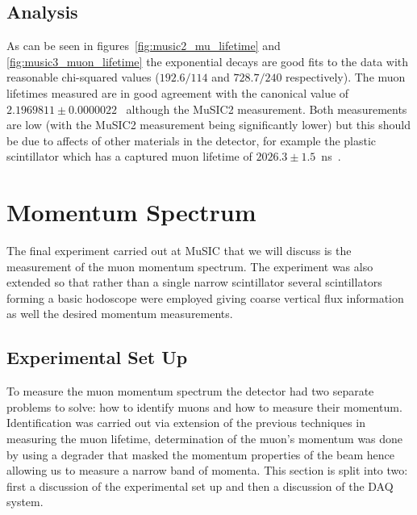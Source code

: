 \section{Analysis} %
\label{sec:analysis}
As can be seen in figures~\ref{fig:music2_mu_lifetime} and \ref{fig:music3_muon_lifetime} the exponential decays are good fits to the data with reasonable chi-squared values (\(192.6/114\) and \( 728.7/240 \) respectively). The muon lifetimes measured are in good agreement with the canonical value of \(2.1969811\pm0.0000022\)~\cite{PDG} although the MuSIC2 measurement. Both measurements are low (with the MuSIC2 measurement being significantly lower) but this should be due to affects of other materials in the detector, for example the plastic scintillator which has a captured muon lifetime of \(2026.3\pm1.5\)~ns~\cite{SUZUKI}. 

\chapter{Momentum Spectrum} %
\label{cha:momentum_spectrum}
The final experiment carried out at MuSIC that we will discuss is the measurement of the muon momentum spectrum. The experiment was also extended so that rather than a single narrow scintillator several scintillators forming a basic hodoscope were employed giving coarse vertical flux information as well the desired momentum measurements.

\section{Experimental Set Up} %
\label{sec:experimental_set_up}
To measure the muon momentum spectrum the detector had two separate problems to solve: how to identify muons and how to measure their momentum. Identification was carried out via extension of the previous techniques in measuring the muon lifetime, determination of the muon's momentum was done by using a degrader that masked the momentum properties of the beam hence allowing us to measure a narrow band of momenta. This section is split into two: first a discussion of the experimental set up and then a discussion of the DAQ system.

